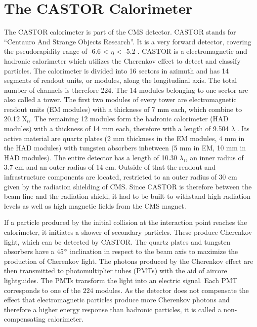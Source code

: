 \section{The CASTOR Calorimeter}

The CASTOR calorimeter is part of the CMS detector. CASTOR stands for \enquote{Centauro And Strange Objects Research}. It is a very forward detector, covering the pseudorapidity range of -6.6 < $\eta$ < -5.2 . CASTOR is a electromagnetic and hadronic calorimeter which utilizes the Cherenkov effect to detect and classify particles. The calorimeter is divided into 16 sectors in azimuth and has 14 segments of readout units, or modules, along the longitudinal axis. The total number of channels is therefore 224. The 14 modules belonging to one sector are also called a tower.
The first two modules of every tower are electromagnetic readout units (EM modules) with a thickness of 7 mm each, which combine to 20.12 X$_0$. The remaining 12 modules form the hadronic calorimeter (HAD modules) with a thickness of 14 mm each, therefore with a length of 9.504 $\lambda_{\mathrm{I}}$. 
Its active material are quartz plates (2 mm thickness in the EM modules, 4 mm in the HAD modules) with tungsten absorbers inbetween (5 mm in EM, 10 mm in HAD modules). The entire detector has a length of 10.30 $\lambda_{\mathrm{I}}$, an inner radius of 3.7 cm and an outer radius of 14 cm. Outside of that the readout and infrastructure components are located, restricted to an outer radius of 30 cm given by the radiation shielding of CMS. Since CASTOR is therefore between the beam line and the radiation shield, it had to be built to withstand high radiation levels as well as high magnetic fields from the CMS magnet. 



If a particle produced by the initial collision at the interaction point reaches the calorimeter, it initiates a shower of secondary particles. These produce Cherenkov light, which can be detected by CASTOR. The quartz plates and tungsten absorbers have a 45$\degree$ inclination in respect to the beam axis to maximize the production of Cherenkov light. The photons produced by the Cherenkov effect are then transmitted to photomultiplier tubes (PMTs) with the aid of aircore lightguides. The PMTs transform the light into an electric signal. Each PMT corresponds to one of the 224 modules.
As the detector does not compensate the effect that electromagnetic particles produce more Cherenkov photons and therefore a higher energy response than hadronic particles, it is called a non-compensating calorimeter.



